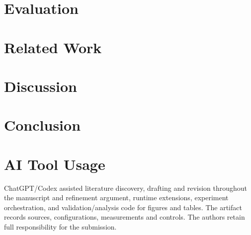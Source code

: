\documentclass[conference,10pt]{IEEEtran}
\begin{document}
\section{Evaluation}\label{sec:eval}






\section{Related Work}\label{sec:related}

\section{Discussion}\label{sec:discussion}

\section{Conclusion}\label{sec:conclusion}

\section*{AI Tool Usage}
ChatGPT/Codex assisted literature discovery, drafting and revision
throughout the manuscript and refinement argument, runtime extensions,
experiment orchestration, and validation/analysis code for figures and
tables. The artifact records sources, configurations, measurements and
controls. The authors retain full responsibility for the submission.
\clearpage


\end{document}

